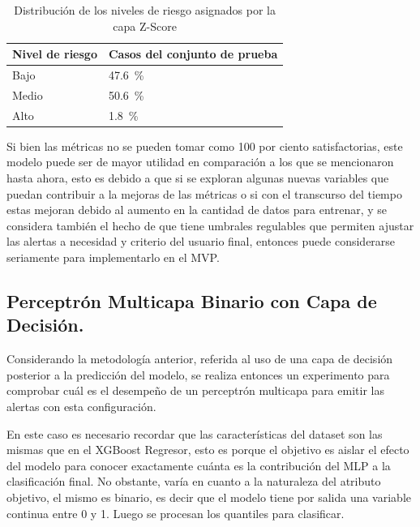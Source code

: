 \begin{table}[htbp]
\centering
\caption{Distribución de los niveles de riesgo asignados por la capa Z-Score}
\label{tab:niveles-riesgo-zscore}
\begin{tabularx}{\linewidth}{@{}lX@{}}
\toprule
\textbf{Nivel de riesgo} & \textbf{Casos del conjunto de prueba} \\
\midrule
Bajo & \qty{47,6}{\percent} \\
Medio & \qty{50,6}{\percent} \\
Alto & \qty{1,8}{\percent} \\
\bottomrule
\end{tabularx}
\end{table}

Si bien las métricas no se pueden tomar como 100 por ciento satisfactorias, este modelo puede ser de mayor utilidad en comparación a los que se mencionaron hasta ahora, esto es debido a que si se exploran algunas nuevas variables que puedan contribuir a la mejoras de las métricas o si con el transcurso del tiempo estas mejoran debido al aumento en la cantidad de datos para entrenar, y se considera también el hecho de que tiene umbrales regulables que permiten ajustar las alertas a necesidad y criterio del usuario final, entonces puede considerarse seriamente para implementarlo en el MVP.

\subsection{Perceptrón Multicapa Binario con Capa de Decisión.}\label{perceptruxf3n-multicapa-binario-con-capa-de-decisiuxf3n.}

Considerando la metodología anterior, referida al uso de una capa de decisión posterior a la predicción del modelo, se realiza entonces un experimento para comprobar cuál es el desempeño de un perceptrón multicapa para emitir las alertas con esta configuración.

En este caso es necesario recordar que las características del dataset son las mismas que en el XGBoost Regresor, esto es porque el objetivo es aislar el efecto del modelo para conocer exactamente cuánta es la contribución del MLP a la clasificación final. No obstante, varía en cuanto a la naturaleza del atributo objetivo, el mismo es binario, es decir que el modelo tiene por salida una variable continua entre 0 y 1. Luego se procesan los quantiles para clasificar.

